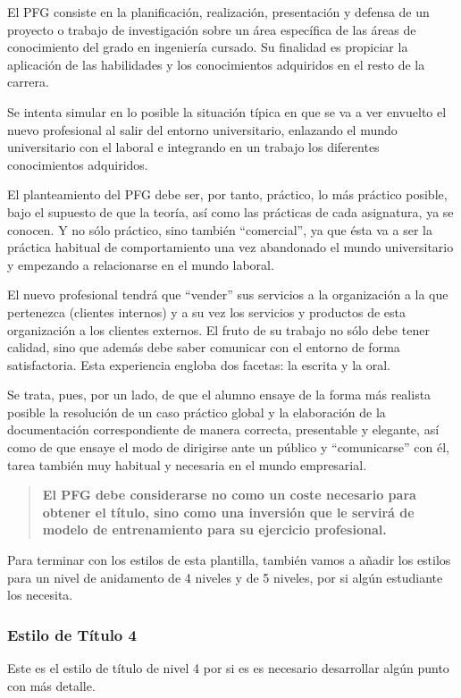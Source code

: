 El PFG consiste en la planificación, realización, presentación y defensa de un proyecto o trabajo de investigación sobre un área específica de las áreas de conocimiento del grado en ingeniería cursado. Su finalidad es propiciar la aplicación de las habilidades y los conocimientos adquiridos en el resto de la carrera.

Se intenta simular en lo posible la situación típica en que se va a ver envuelto el nuevo profesional al salir del entorno universitario, enlazando el mundo universitario con el laboral e integrando en un trabajo los diferentes conocimientos adquiridos.

El planteamiento del PFG debe ser, por tanto, práctico, lo más práctico posible, bajo el supuesto de que la teoría, así como las prácticas de cada asignatura, ya se conocen. Y no sólo práctico, sino también “comercial”, ya que ésta va a ser la práctica habitual de comportamiento una vez abandonado el mundo universitario y empezando a relacionarse en el mundo laboral.

El nuevo profesional tendrá que “vender” sus servicios a la organización a la que pertenezca (clientes internos) y a su vez los servicios y productos de esta organización a los clientes externos. El fruto de su trabajo no sólo debe tener calidad, sino que además debe saber comunicar con el entorno de forma satisfactoria.
Esta experiencia engloba dos facetas: la escrita y la oral.

Se trata, pues, por un lado, de que el alumno ensaye de la forma más realista posible la resolución de un caso práctico global y la elaboración de la documentación correspondiente de manera correcta, presentable y elegante, así como de que ensaye el modo de dirigirse ante un público y “comunicarse” con él, tarea también muy habitual y necesaria en el mundo empresarial.


\begin{quote}
  \textbf{El PFG debe considerarse no como un coste necesario para obtener el título, sino como una inversión que le servirá de modelo de entrenamiento para su ejercicio profesional.}
\end{quote}

Para terminar con los estilos de esta plantilla, también vamos a añadir los estilos para un nivel de anidamento de 4 niveles y de 5 niveles, por si algún estudiante los necesita.


\subsubsection{Estilo de Título 4}
Este es el estilo de título de nivel 4 por si es es necesario desarrollar algún punto con más detalle.

